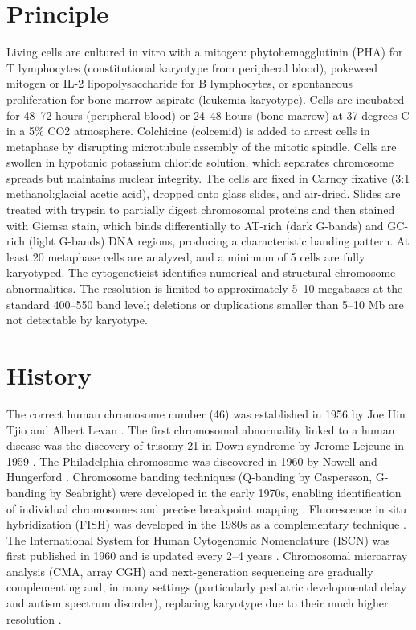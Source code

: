 \section*{Principle}
Living cells are cultured in vitro with a mitogen: phytohemagglutinin (PHA) for T lymphocytes (constitutional karyotype from peripheral blood), pokeweed mitogen or IL-2 lipopolysaccharide for B lymphocytes, or spontaneous proliferation for bone marrow aspirate (leukemia karyotype). Cells are incubated for 48--72 hours (peripheral blood) or 24--48 hours (bone marrow) at 37 degrees C in a 5\% CO2 atmosphere. Colchicine (colcemid) is added to arrest cells in metaphase by disrupting microtubule assembly of the mitotic spindle. Cells are swollen in hypotonic potassium chloride solution, which separates chromosome spreads but maintains nuclear integrity. The cells are fixed in Carnoy fixative (3:1 methanol:glacial acetic acid), dropped onto glass slides, and air-dried. Slides are treated with trypsin to partially digest chromosomal proteins and then stained with Giemsa stain, which binds differentially to AT-rich (dark G-bands) and GC-rich (light G-bands) DNA regions, producing a characteristic banding pattern. At least 20 metaphase cells are analyzed, and a minimum of 5 cells are fully karyotyped. The cytogeneticist identifies numerical and structural chromosome abnormalities. The resolution is limited to approximately 5--10 megabases at the standard 400--550 band level; deletions or duplications smaller than 5--10 Mb are not detectable by karyotype.

\section*{History}
The correct human chromosome number (46) was established in 1956 by Joe Hin Tjio and Albert Levan \cite{tjio1956chromosome}. The first chromosomal abnormality linked to a human disease was the discovery of trisomy 21 in Down syndrome by Jerome Lejeune in 1959 \cite{lejeune1959etude}. The Philadelphia chromosome was discovered in 1960 by Nowell and Hungerford \cite{nowell1960minute}. Chromosome banding techniques (Q-banding by Caspersson, G-banding by Seabright) were developed in the early 1970s, enabling identification of individual chromosomes and precise breakpoint mapping \cite{caspersson1970identification, seabright1971rapid}. Fluorescence in situ hybridization (FISH) was developed in the 1980s as a complementary technique \cite{pinkel1986cytogenetic}. The International System for Human Cytogenomic Nomenclature (ISCN) was first published in 1960 and is updated every 2--4 years \cite{mcgowanjordan2020iscn}. Chromosomal microarray analysis (CMA, array CGH) and next-generation sequencing are gradually complementing and, in many settings (particularly pediatric developmental delay and autism spectrum disorder), replacing karyotype due to their much higher resolution \cite{miller2010consensus, south2013acmg}.

